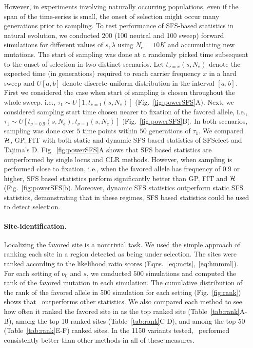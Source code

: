 However, in experiments involving naturally occurring populations,
even if the span of the time-series is small, the onset of selection
might occur many generations prior to sampling. To test performance of
SFS-based statistics in natural evolution, we conducted 200 (100
neutral and 100 sweep) forward simulations for different values of
$s,\lambda$ using $N_e=10K$ and accumulating new mutations. The start
of sampling was done at a randomly picked time subsequent to the onset
of selection in two distinct scenarios. Let $t_{\nu=x}(s,N_e)$ denote
the expected time (in generations) required to reach carrier frequency
$x$ in a hard sweep and $U[a,b]$ denote discrete uniform distribution
in the interval $[a,b]$. First we considered the case when start of
sampling is chosen throughout the whole sweep. i.e., $\tau_1 \sim
U\left[1,t_{\nu=1}(s,N_e)\right]$ (Fig.~\ref{fig:powerSFS}A). Next, we
considered sampling start time chosen nearer to fixation of the
favored allele, i.e., $\tau_1 \sim
U\left[t_{\nu=0.9}(s,N_e),t_{\nu=1}(s,N_e)\right]$
(Fig.~\ref{fig:powerSFS}B). In both scenarios, sampling was done over
$5$ time points within $50$ generations of $\tau_1$. We compared
${\cal H}$, GP, FIT with both static and dynamic SFS based statistics of
SFSelect and Tajima's D. Fig.~\ref{fig:powerSFS}A shows that SFS based
statistics are outperformed by single locus and CLR methods. However,
when sampling is performed close to fixation, i.e., when the favored
allele has frequency of 0.9 or higher, SFS based statistics perform
significantly better than GP, FIT and ${\cal H}$
(Fig.~\ref{fig:powerSFS}b). Moreover, dynamic SFS statistics
outperform static SFS statistics, demonstrating that in these regimes,
SFS based statistics could be used to detect selection.


\paragraph{Site-identification.}
Localizing the favored site is a nontrivial task. We used the simple
approach of ranking each site in a region detected as being under
selection. The sites were ranked according to the likelihood ratio
scores (Eqns.~\ref{eq:mcts},~\ref{eq:hmmml}). For each setting of
$\nu_0$ and $s$, we conducted $500$ simulations and computed the rank
of the favored mutation in each simulation. The cumulative
distribution of the rank of the favored allele in 500 simulation for
each setting (Fig.~\ref{fig:rank}) shows that \comale\ outperforms
other statistics. We also compared each method to see how often it
ranked the favored site in as the top ranked site
(Table~\ref{tab:rank}A-B), among the top 10 ranked sites
(Table~\ref{tab:rank}C-D), and among the top 50
(Table~\ref{tab:rank}E-F) ranked sites. In the 1150 variants tested,
\comale\ performed consistently better than other methods in all of
these measures.

